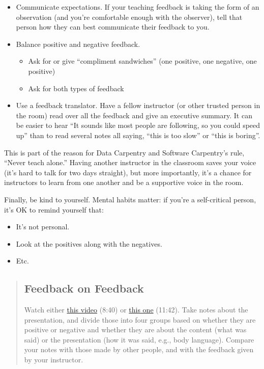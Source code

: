 \begin{itemize}
\item Communicate expectations. If your teaching feedback is taking the form of an
observation (and you're comfortable enough with the observer), tell
that person how they can best communicate their feedback to you.
\item Balance positive and negative feedback.


\begin{itemize}
\item Ask for or give ``compliment sandwiches'' (one positive, one negative, one positive)
\item Ask for both types of feedback
\end{itemize}
\item Use a feedback translator.  Have a fellow
instructor (or other trusted person in the room) read over all the feedback and give
an executive summary.   It can be easier to hear ``It sounds like most people
are following, so you could speed up'' than to read several notes all saying, ``this is
too slow'' or ``this is boring''.
\end{itemize}

This is part of the reason for Data Carpentry and Software Carpentry's rule,
``Never teach alone.''
Having another instructor in the classroom saves your voice
(it's hard to talk for two days straight),
but more importantly,
it's a chance for instructors to learn from one another and be a supportive voice
in the room.

Finally, be kind to yourself.
Mental habits matter: if you're a self-critical person,
it's OK to remind yourself that:

\begin{itemize}
\item It's not personal.
\item Look at the positives along with the negatives.
\item Etc.
\end{itemize}

\begin{quotation}   %
\subsection*{Feedback on Feedback}

Watch either \href{https://vimeo.com/139316669}{this video} (8:40)
or \href{https://vimeo.com/139181120}{this one} (11:42).
Take notes about the presentation,
and divide those into four groups
based on whether they are positive or negative
and whether they are about the content (what was said)
or the presentation (how it was said, e.g., body language).
Compare your notes with those made by other people,
and with the feedback given by your instructor.
\end{quotation}   %

